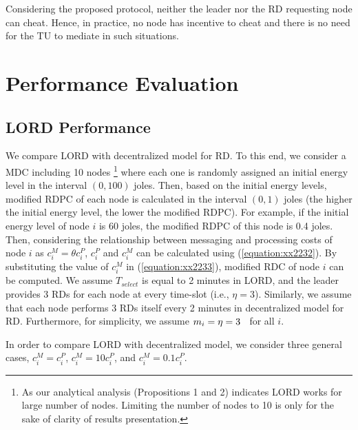 \documentclass[journal,12pt, onecolumn]{IEEEtran}
\begin{document}
Considering the proposed protocol, neither the leader nor the RD requesting node can cheat. Hence, in practice, no node has incentive to cheat and there is no need for the TU to mediate in such situations.


\section{Performance Evaluation} 
\subsection{LORD Performance}
We compare LORD with decentralized model for RD. To this end, we consider a MDC including 10 nodes \footnote[1]{As our analytical analysis (Propositions 1 and 2) indicates LORD works for large number of nodes. Limiting the number of nodes to 10 is only for the sake of clarity of results presentation.} where each one is randomly assigned an initial energy level in the interval $(0,100)$ joles. Then, based on the initial energy levels, modified RDPC of each node is calculated in the interval $(0, 1)$ joles (the higher the initial energy level, the lower the modified RDPC). For example, if the initial energy level of node $i$ is 60 joles, the modified RDPC of this node is 0.4 joles. Then, considering the relationship between messaging and processing costs of node $i$ as $c_i ^M = \theta c_i ^P$, $c_i ^P$ and $c_i ^M$ can be calculated using (\ref{equation:xx2232}). By substituting the value of $c_i ^M$ in (\ref{equation:xx2233}), modified RDC of node $i$ can be computed. 
We assume $T_{select}$ is equal to 2 minutes in LORD, and the leader provides 3 RDs for each node at every time-slot (i.e., $\eta=3$). Similarly, we assume that each node performs 3 RDs itself every 2 minutes in decentralized model for RD. Furthermore, for simplicity, we assume $m_i = \eta =3 \hspace{2mm}$ for all $i$. 


In order to compare LORD with decentralized model, we consider three general cases, $c_i ^{M} = c_i ^{P}$, $c_i ^{M} = 10c_i ^{P}$, and $c_i ^{M} = 0.1c_i ^{P}$.
\end{document}
